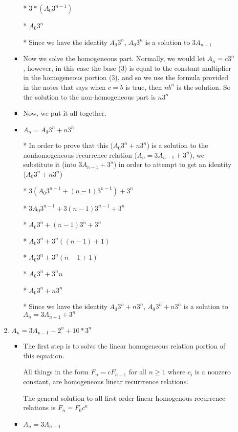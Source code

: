 \documentclass{article}
\begin{document}
\begin{enumerate}
\begin{enumerate}
\begin{itemize}
    \item [*] $3*(A_{0}3^{n-1})$
    \item [*] $A_{0}3^{n}$
    \item [*] Since we have the identity $A_{0}3^{n}$, $A_{0}3^{n}$ is a solution to $3A_{n-1}$
    \item Now we solve the homogeneous part. Normally, we would let $A_{n}=c3^{n}$, however, in this case the base ($3$) is equal to the constant multiplier in the homogeneous portion ($3$), and so we use the formula provided in the notes that says when $c=b$ is true, then $nb^{n}$ is the solution. So the solution to the non-homogeneous part is $n3^{n}$
    \item Now, we put it all together.
    \item $A_{n}=A_{0}3^{n} + n3^{n}$
    \item [*] In order to prove that this ($A_{0}3^{n}+n3^{n}$) is a solution to the nonhomogeneous recurrence relation ($A_{n}=3A_{n-1}+3^{n}$), we substitute it (into $3A_{n-1}+3^{n}$) in order to attempt to get an identity ($A_{0}3^{n}+n3^{n}$)
    \item [*] $3(A_{0}3^{n-1} + (n-1)3^{n-1}) + 3^{n}$
    \item [*] $3A_{0}3^{n-1} + 3(n-1)3^{n-1} + 3^{n}$
    \item [*] $A_{0}3^{n} + (n-1)3^{n} + 3^{n}$
    \item [*] $A_{0}3^{n} + 3^{n}((n-1) + 1)$
    \item [*] $A_{0}3^{n} + 3^{n}(n-1+1)$
    \item [*] $A_{0}3^{n} + 3^{n}n$
    \item [*] $A_{0}3^{n} + n3^{n}$
    \item [*] Since we have the identity $A_{0}3^{n}+n3^{n}$, $A_{0}3^{n}+n3^{n}$ is a solution to $A_{n}=3A_{n-1}+3^{n}$
    \end{itemize} %
  \item $A_{n}=3A_{n-1}-2^{n}+10*3^{n}$
    \begin{itemize} %
    \item The first step is to solve the linear homogeneous relation portion of this equation.
    \item [] All things in the form $F_{n}=cF_{n-1}$ for all $n\geq1$ where $c_{i}$ is a nonzero constant, are homogeneous linear recurrrence relations.
    \item [] The general solution to all first order linear homogenous recurrence relations is $F_{n}=F_{0}c^{n}$
    \item $A_{n}=3A_{n-1}$

\end{itemize}
\end{enumerate}
\end{enumerate}
\end{document}
